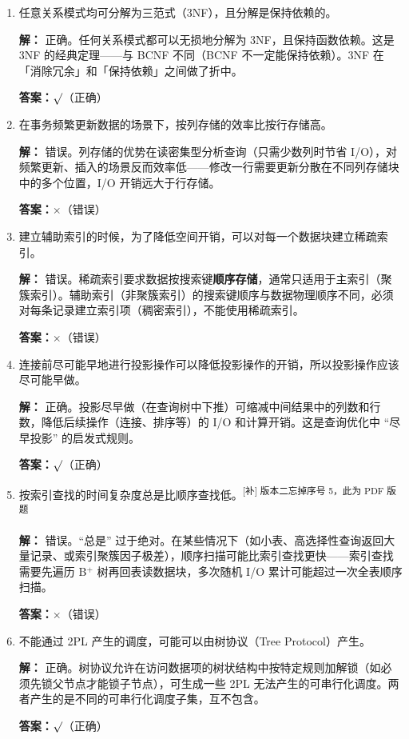 \documentclass[11pt,a4paper]{article}
\newcommand{\solution}{\par\noindent\textcolor{ansblue}{\textbf{解：}}}
\newcommand{\answer}{\par\noindent\textcolor{ansred}{\textbf{答案：}}}
\newcommand{\supp}[1]{\textcolor{ansred}{\textsuperscript{[补] #1}}}
\begin{document}
\begin{enumerate}[leftmargin=*,itemsep=6pt]

\item 任意关系模式均可分解为三范式（3NF），且分解是保持依赖的。

\solution
正确。任何关系模式都可以无损地分解为 3NF，且保持函数依赖。这是 3NF 的经典定理——与 BCNF 不同（BCNF 不一定能保持依赖）。3NF 在「消除冗余」和「保持依赖」之间做了折中。

\answer \textcolor{ansred}{$\surd$（正确）}

\item 在事务频繁更新数据的场景下，按列存储的效率比按行存储高。

\solution
错误。列存储的优势在读密集型分析查询（只需少数列时节省 I/O），对频繁更新、插入的场景反而效率低——修改一行需要更新分散在不同列存储块中的多个位置，I/O 开销远大于行存储。

\answer \textcolor{ansred}{$\times$（错误）}

\item 建立辅助索引的时候，为了降低空间开销，可以对每一个数据块建立稀疏索引。

\solution
错误。稀疏索引要求数据按搜索键\textbf{顺序存储}，通常只适用于主索引（聚簇索引）。辅助索引（非聚簇索引）的搜索键顺序与数据物理顺序不同，必须对每条记录建立索引项（稠密索引），不能使用稀疏索引。

\answer \textcolor{ansred}{$\times$（错误）}

\item 连接前尽可能早地进行投影操作可以降低投影操作的开销，所以投影操作应该尽可能早做。

\solution
正确。投影尽早做（在查询树中下推）可缩减中间结果中的列数和行数，降低后续操作（连接、排序等）的 I/O 和计算开销。这是查询优化中 ``尽早投影'' 的启发式规则。

\answer \textcolor{ansred}{$\surd$（正确）}

\item 按索引查找的时间复杂度总是比顺序查找低。\supp{版本二忘掉序号 5，此为 PDF 版题}

\solution
错误。``总是'' 过于绝对。在某些情况下（如小表、高选择性查询返回大量记录、或索引聚簇因子极差），顺序扫描可能比索引查找更快——索引查找需要先遍历 B$^+$ 树再回表读数据块，多次随机 I/O 累计可能超过一次全表顺序扫描。

\answer \textcolor{ansred}{$\times$（错误）}

\item 不能通过 2PL 产生的调度，可能可以由树协议（Tree Protocol）产生。

\solution
正确。树协议允许在访问数据项的树状结构中按特定规则加解锁（如必须先锁父节点才能锁子节点），可生成一些 2PL 无法产生的可串行化调度。两者产生的是不同的可串行化调度子集，互不包含。

\answer \textcolor{ansred}{$\surd$（正确）}

\end{enumerate}
\end{document}
